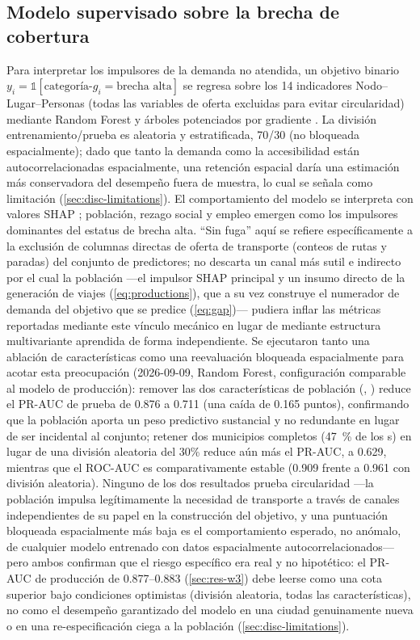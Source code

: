 \subsection{Modelo supervisado sobre la brecha de cobertura}
Para interpretar los impulsores de la demanda no atendida, un objetivo binario
$y_i = \mathbb{1}[\text{categoría-}g_i = \text{brecha alta}]$ se regresa sobre los
\num{14} indicadores Nodo--Lugar--Personas (todas las variables de oferta excluidas
para evitar circularidad) mediante Random Forest y árboles potenciados por gradiente
\parencite{niu2023rf,ke2017lightgbm}. La división entrenamiento/prueba es aleatoria y
estratificada, 70/30 (no bloqueada espacialmente); dado que tanto la demanda como la
accesibilidad están autocorrelacionadas espacialmente, una retención espacial daría una
estimación más conservadora del desempeño fuera de muestra, lo cual se señala como
limitación (\cref{sec:disc-limitations}). El comportamiento del modelo se interpreta con
valores SHAP \parencite{lundberg2017shap}; población, rezago social y empleo emergen
como los impulsores dominantes del estatus de brecha alta. ``Sin fuga'' aquí se refiere
específicamente a la exclusión de columnas directas de oferta de transporte (conteos de
rutas y paradas) del conjunto de predictores; no descarta un canal más sutil e
indirecto por el cual la población ---el impulsor SHAP principal y un insumo directo de
la generación de viajes (\cref{eq:productions}), que a su vez construye el numerador de
demanda del objetivo que se predice (\cref{eq:gap})--- pudiera inflar las métricas
reportadas mediante este vínculo mecánico en lugar de mediante estructura multivariante
aprendida de forma independiente. Se ejecutaron tanto una ablación de características como
una reevaluación bloqueada espacialmente para acotar esta preocupación (2026-09-09,
Random Forest, configuración comparable al modelo de producción): remover las dos
características de población (, )
reduce el PR-AUC de prueba de \num{0.876} a \num{0.711} (una caída de \num{0.165}
puntos), confirmando que la población aporta un peso predictivo sustancial y no
redundante en lugar de ser incidental al conjunto; retener dos municipios completos
(\SI{47}{\percent} de los \ageb{}s) en lugar de una división aleatoria del 30\% reduce
aún más el PR-AUC, a \num{0.629}, mientras que el ROC-AUC es comparativamente estable
(\num{0.909} frente a \num{0.961} con división aleatoria). Ninguno de los dos resultados
prueba circularidad ---la población impulsa legítimamente la necesidad de transporte a
través de canales independientes de su papel en la construcción del objetivo, y una
puntuación bloqueada espacialmente más baja es el comportamiento esperado, no anómalo,
de cualquier modelo entrenado con datos espacialmente autocorrelacionados--- pero ambos
confirman que el riesgo específico era real y no hipotético: el PR-AUC de producción de
\num{0.877}--\num{0.883} (\cref{sec:res-w3}) debe leerse como una cota superior bajo
condiciones optimistas (división aleatoria, todas las características), no como el
desempeño garantizado del modelo en una ciudad genuinamente nueva o en una
re-especificación ciega a la población (\cref{sec:disc-limitations}).

